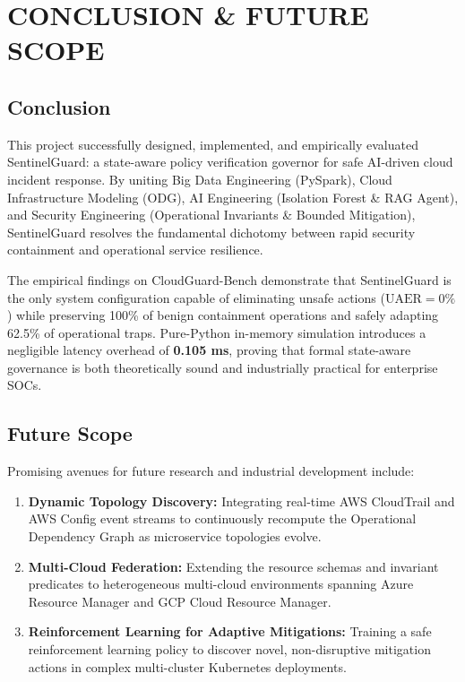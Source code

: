 \documentclass[12pt,a4paper]{report}
\begin{document}
\chapter{CONCLUSION \& FUTURE SCOPE}

\section{Conclusion}\label{sec:conclusion}
This project successfully designed, implemented, and empirically evaluated SentinelGuard: a state-aware policy verification governor for safe AI-driven cloud incident response. By uniting Big Data Engineering (PySpark), Cloud Infrastructure Modeling (ODG), AI Engineering (Isolation Forest \& RAG Agent), and Security Engineering (Operational Invariants \& Bounded Mitigation), SentinelGuard resolves the fundamental dichotomy between rapid security containment and operational service resilience.

The empirical findings on CloudGuard-Bench demonstrate that SentinelGuard is the only system configuration capable of eliminating unsafe actions ($\text{UAER} = 0\%$) while preserving 100\% of benign containment operations and safely adapting 62.5\% of operational traps. Pure-Python in-memory simulation introduces a negligible latency overhead of \textbf{0.105 ms}, proving that formal state-aware governance is both theoretically sound and industrially practical for enterprise SOCs.

\section{Future Scope}\label{sec:future_scope}
Promising avenues for future research and industrial development include:
\begin{enumerate}
    \item \textbf{Dynamic Topology Discovery:} Integrating real-time AWS CloudTrail and AWS Config event streams to continuously recompute the Operational Dependency Graph as microservice topologies evolve.
    \item \textbf{Multi-Cloud Federation:} Extending the resource schemas and invariant predicates to heterogeneous multi-cloud environments spanning Azure Resource Manager and GCP Cloud Resource Manager.
    \item \textbf{Reinforcement Learning for Adaptive Mitigations:} Training a safe reinforcement learning policy to discover novel, non-disruptive mitigation actions in complex multi-cluster Kubernetes deployments.
\end{enumerate}
\end{document}
